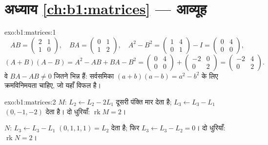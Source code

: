 \section*{अध्याय \ref{ch:b1:matrices} --- आव्यूह}

\begin{solution}{exo:b1:matrices:1}
\[
AB = \begin{pmatrix} 2 & 1\\ 1 & 0\end{pmatrix},
\quad
BA = \begin{pmatrix} 0 & 1\\ 1 & 2\end{pmatrix},
\quad
A^2 - B^2 = \begin{pmatrix} 1 & 4\\ 0 & 1\end{pmatrix} - I
= \begin{pmatrix} 0 & 4\\ 0 & 0\end{pmatrix},
\]
\[
(A+B)(A-B) = A^2 - AB + BA - B^2
= \begin{pmatrix} 0 & 4\\ 0 & 0\end{pmatrix} +
\begin{pmatrix} -2 & 0\\ 0 & 2 \end{pmatrix}
= \begin{pmatrix} -2 & 4\\ 0 & 2\end{pmatrix}.
\]
वे $BA - AB \neq 0$ जितने भिन्न हैं: सर्वसमिका $(a+b)(a-b) = a^2 - b^2$ के
लिए क्रमविनिमयता चाहिए, जो यहाँ विफल है।
\end{solution}

\begin{solution}{exo:b1:matrices:2}
$M$: $L_2 \leftarrow L_2 - 2L_1$ दूसरी पंक्ति मार देता है; $L_3 \leftarrow
L_3 - L_1$ $(0, -1, -2)$ देता है। दो धुरियाँ: $\operatorname{rk} M = 2$।

$N$: $L_3 \leftarrow L_3 - L_1$ $(0,1,1,1) = L_2$ देता है; फिर $L_3
\leftarrow L_3 - L_2 = 0$। दो धुरियाँ: $\operatorname{rk} N = 2$।
\end{solution}

